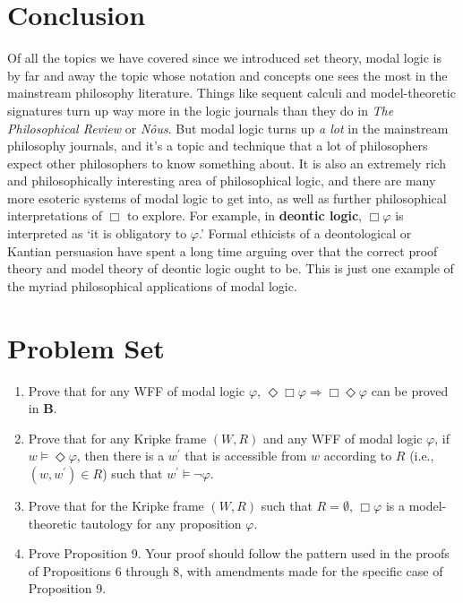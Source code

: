\documentclass[11pt]{article}
\theoremstyle{definition}
\theoremstyle{remark}
\begin{document}
\section{Conclusion}
Of all the topics we have covered since we introduced set theory, modal logic is by far and away the topic whose notation and concepts one sees the most in the mainstream philosophy literature. Things like sequent calculi and model-theoretic signatures turn up way more in the logic journals than they do in \textit{The Philosophical Review} or \textit{N\^ous}. But modal logic turns up \textit{a lot} in the mainstream philosophy journals, and it's a topic and technique that a lot of philosophers expect other philosophers to know something about. It is also an extremely rich and philosophically interesting area of philosophical logic, and there are many more esoteric systems of modal logic to get into, as well as further philosophical interpretations of $\Box$ to explore. For example, in \textbf{deontic logic}, $\Box\varphi$ is interpreted as `it is obligatory to $\varphi$.' Formal ethicists of a deontological or Kantian persuasion have spent a long time arguing over that the correct proof theory and model theory of deontic logic ought to be. This is just one example of the myriad philosophical applications of modal logic.\par

\section*{Problem Set}
\begin{enumerate}
    \item Prove that for any WFF of modal logic $\varphi$, $\Diamond\Box\varphi\Rightarrow\Box\Diamond\varphi$ can be proved in \textbf{B}. 

    \item Prove that for any Kripke frame $(W,R)$ and any WFF of modal logic $\varphi$, if $w\vDash\Diamond \varphi$, then there is a $w^{\prime}$ that is accessible from $w$ according to $R$ (i.e., $(w,w^{\prime})\in R$) such that $w^{\prime}\vDash\neg \varphi$. 

    \item Prove that for the Kripke frame $(W,R)$ such that $R=\emptyset$, $\Box \varphi$ is a model-theoretic tautology for any proposition $\varphi$. 

    \item Prove Proposition 9. Your proof should follow the pattern used in the proofs of Propositions 6 through 8, with amendments made for the specific case of Proposition 9.
\end{enumerate}
\end{document}
